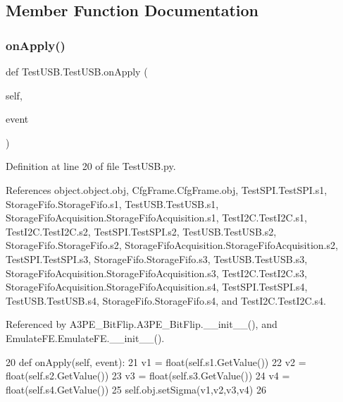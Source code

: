 \subsection{Member Function Documentation}
\mbox{\label{classTestUSB_1_1TestUSB_a84bfb6f16ea97644b1369e853a0da21b}} 
\subsubsection{\texorpdfstring{on\+Apply()}{onApply()}}
{\footnotesize\ttfamily def Test\+U\+S\+B.\+Test\+U\+S\+B.\+on\+Apply (\begin{DoxyParamCaption}\item[{}]{self,  }\item[{}]{event }\end{DoxyParamCaption})}



Definition at line 20 of file Test\+U\+S\+B.\+py.



References object.\+object.\+obj, Cfg\+Frame.\+Cfg\+Frame.\+obj, Test\+S\+P\+I.\+Test\+S\+P\+I.\+s1, Storage\+Fifo.\+Storage\+Fifo.\+s1, Test\+U\+S\+B.\+Test\+U\+S\+B.\+s1, Storage\+Fifo\+Acquisition.\+Storage\+Fifo\+Acquisition.\+s1, Test\+I2\+C.\+Test\+I2\+C.\+s1, Test\+I2\+C.\+Test\+I2\+C.\+s2, Test\+S\+P\+I.\+Test\+S\+P\+I.\+s2, Test\+U\+S\+B.\+Test\+U\+S\+B.\+s2, Storage\+Fifo.\+Storage\+Fifo.\+s2, Storage\+Fifo\+Acquisition.\+Storage\+Fifo\+Acquisition.\+s2, Test\+S\+P\+I.\+Test\+S\+P\+I.\+s3, Storage\+Fifo.\+Storage\+Fifo.\+s3, Test\+U\+S\+B.\+Test\+U\+S\+B.\+s3, Storage\+Fifo\+Acquisition.\+Storage\+Fifo\+Acquisition.\+s3, Test\+I2\+C.\+Test\+I2\+C.\+s3, Storage\+Fifo\+Acquisition.\+Storage\+Fifo\+Acquisition.\+s4, Test\+S\+P\+I.\+Test\+S\+P\+I.\+s4, Test\+U\+S\+B.\+Test\+U\+S\+B.\+s4, Storage\+Fifo.\+Storage\+Fifo.\+s4, and Test\+I2\+C.\+Test\+I2\+C.\+s4.



Referenced by A3\+P\+E\+\_\+\+Bit\+Flip.\+A3\+P\+E\+\_\+\+Bit\+Flip.\+\_\+\+\_\+init\+\_\+\+\_\+(), and Emulate\+F\+E.\+Emulate\+F\+E.\+\_\+\+\_\+init\+\_\+\+\_\+().


\begin{DoxyCode}
20     \textcolor{keyword}{def }onApply(self, event):
21         v1 = float(self.s1.GetValue())
22         v2 = float(self.s2.GetValue())
23         v3 = float(self.s3.GetValue())
24         v4 = float(self.s4.GetValue())
25         self.obj.setSigma(v1,v2,v3,v4)
26 
\end{DoxyCode}
\mbox{\label{classTestUSB_1_1TestUSB_a89c7535b44613d7a31879376527aadc7}} 
